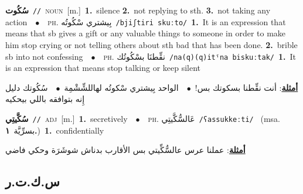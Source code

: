 \documentclass[10pt,a4paper,twoside]{article} %
\begin{document}
\begin{multicols}{2}
{\setlength\topsep{0pt}\textbf{\foreignlanguage{arabic}{سُكُوت}}\ {\color{gray}\texttt{//}\color{black}}\ \textsc{noun}\ [m.]\ \textbf{1.}~silence  \textbf{2.}~not replying to sth.  \textbf{3.}~not taking any action\ \ $\bullet$\ \ \textsc{ph.} \color{gray} \foreignlanguage{arabic}{بِيشتري سْكُوتُه}\color{black}\ {\color{gray}\texttt{/{\sffamily bjiʃtiri skuːto}/}\color{black}}\ \textbf{1.}~It is an expression that means that sb gives a gift or any valuable things to someone in order to make him stop crying or not telling others about sth bad that has been done.  \textbf{2.}~brible sb into not confessing\ \ $\bullet$\ \ \textsc{ph.} \color{gray} \foreignlanguage{arabic}{نقِّطنَا بسْكُوتُك}\color{black}\ {\color{gray}\texttt{/{\sffamily na(q)(q)itˤna biskuːtak}/}\color{black}}\ \textbf{1.}~It is an expression that means stop talking or keep silent\  \begin{flushright}\color{gray}\foreignlanguage{arabic}{\textbf{\underline{\foreignlanguage{arabic}{أمثلة}}}: أنت نقِّطنا بسكوتك بس!\ $\bullet$\ \  الواحد بِيشتري سْكوتُه لهاللشِّشْمِة\ $\bullet$\ \  سُكُوتك دليل إِنه بتوافقه باللي بيحكيه}\end{flushright}\color{black}} \vspace{2mm}

{\setlength\topsep{0pt}\textbf{\foreignlanguage{arabic}{سُكَّيتِي}}\ {\color{gray}\texttt{//}\color{black}}\ \textsc{adj}\ [m.]\ \textbf{1.}~secretively\ \ $\bullet$\ \ \textsc{ph.} \color{gray} \foreignlanguage{arabic}{عَالسُّكَّيتِي}\color{black}\ {\color{gray}\texttt{/{\sffamily ʕassukkeːti}/}\color{black}}\ \color{gray} (msa. \foreignlanguage{arabic}{بسرِّيَّة}~\foreignlanguage{arabic}{\textbf{١.}})\color{black}\ \textbf{1.}~confidentially\  \begin{flushright}\color{gray}\foreignlanguage{arabic}{\textbf{\underline{\foreignlanguage{arabic}{أمثلة}}}: عملنا عرس عالسُّكِّيتي بس الأقارب بدناش شوشَرَة وحكي فاضي}\end{flushright}\color{black}} \vspace{2mm}

\vspace{-3mm}
\subsection*{\color{blue}\foreignlanguage{arabic}{س.ك.ت.ر}\color{blue}{}} 


\end{multicols}
\end{document}
